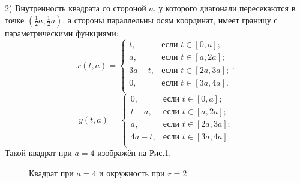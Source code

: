 \documentclass[a4paper]{article}
\begin{document}
  2) Внутренность квадрата со стороной $a$, у которого диагонали пересекаются в точке $(\frac{1}{2}a,\frac{1}{2}a)$, а стороны параллельны осям координат, имеет границу с параметрическими функциями:
        \[
          x(t,a) =
          \begin{cases}
            t,    & \text{если $t \in [0,a]$;}   \\
            a,    & \text{если $t \in [a,2a]$;}  \\
            3a-t, & \text{если $t \in [2a,3a]$;} \\
            0,    & \text{если $t \in [3a,4a]$.} \\
          \end{cases},
        \]
        \[
          y(t,a) =
          \begin{cases}
            0,    & \text{если $t \in [0,a]$;}   \\
            t-a,  & \text{если $t \in [a,2a]$;}  \\
            a,    & \text{если $t \in [2a,3a]$;} \\
            4a-t, & \text{если $t \in [3a,4a]$.} \\
          \end{cases}
        \]
        Такой квадрат при $a=4$ изображён на Рис.\ref{kvci}.
        \begin{figure}[h!]
          \noindent{}
          \caption{Квадрат при $a=4$ и окружность при $r=2$}
          \label{kvci}
        \end{figure}
\end{document}
